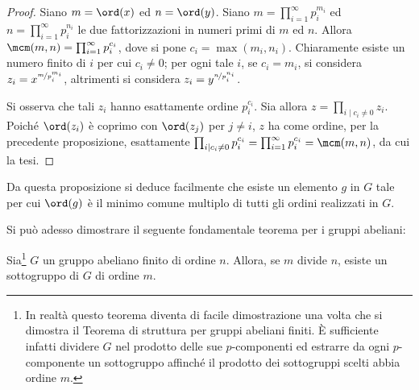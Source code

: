 \documentclass[12pt]{scrartcl}
\begin{document}
	\begin{proof}
		Siano $m = \ord(x)$ ed $n = \ord(y)$. Siano $m = \prod_{i = 1}^\infty p_i^{m_i}$
		ed $n = \prod_{i = 1}^\infty p_i^{n_i}$ le due fattorizzazioni in numeri primi
		di $m$ ed $n$. Allora $\mcm(m, n) = \prod_{i = 1}^\infty p_i^{c_i}$,
		dove si pone $c_i = \max(m_i, n_i)$. Chiaramente esiste un numero finito di
		$i$ per cui $c_i \neq 0$; per ogni tale $i$, se $c_i = m_i$, si considera
		$z_i = x^{\nicefrac{m}{p_i^{m_i}}}$, altrimenti si considera
		$z_i = y^{\nicefrac{n}{p_i^{n_i}}}$. \medskip
		
		
		Si osserva che tali $z_i$ hanno esattamente ordine $p_i^{c_i}$.
		Sia allora $z = \prod_{i \mid c_i \neq 0} z_i$. Poiché $\ord(z_i)$ è coprimo
		con $\ord(z_j)$ per $j \neq i$, $z$ ha come ordine, per la precedente proposizione,
		esattamente $\prod_{i \mid c_i \neq 0} p_i^{c_i} = \prod_{i = 1}^\infty p_i^{c_i} =
		\mcm(m, n)$, da cui la tesi.
	\end{proof}

	Da questa proposizione si deduce facilmente che esiste un
	elemento $g$ in $G$ tale per cui $\ord(g)$ è il minimo
	comune multiplo di tutti gli ordini realizzati in $G$. \medskip


	Si può adesso dimostrare il seguente fondamentale
	teorema per i gruppi abeliani:
	
	\begin{theorem}
		Sia\footnote{
			In realtà questo teorema diventa di facile
			dimostrazione una
			volta che si dimostra il Teorema di struttura
			per gruppi abeliani finiti. È sufficiente
			infatti dividere $G$ nel prodotto delle sue
			$p$-componenti ed estrarre da ogni $p$-componente
			un sottogruppo affinché il prodotto dei sottogruppi
			scelti abbia ordine $m$.
		} $G$ un gruppo abeliano finito di ordine $n$.
		Allora, se $m$ divide $n$, esiste un sottogruppo di
		$G$ di ordine $m$.
	\end{theorem}
\end{document}
